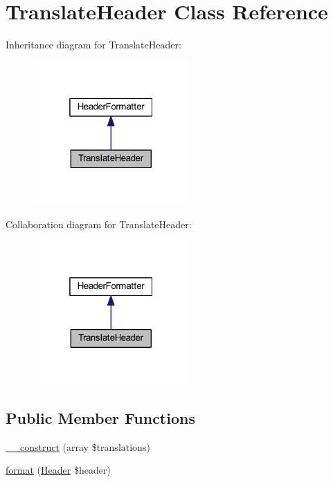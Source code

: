\hypertarget{classhamburgscleanest_1_1_data_tables_1_1_models_1_1_header_formatters_1_1_translate_header}{}\section{Translate\+Header Class Reference}
\label{classhamburgscleanest_1_1_data_tables_1_1_models_1_1_header_formatters_1_1_translate_header}


Inheritance diagram for Translate\+Header\+:\nopagebreak
\begin{figure}[H]
\begin{center}
\leavevmode
\includegraphics[width=169pt]{classhamburgscleanest_1_1_data_tables_1_1_models_1_1_header_formatters_1_1_translate_header__inherit__graph}
\end{center}
\end{figure}


Collaboration diagram for Translate\+Header\+:\nopagebreak
\begin{figure}[H]
\begin{center}
\leavevmode
\includegraphics[width=169pt]{classhamburgscleanest_1_1_data_tables_1_1_models_1_1_header_formatters_1_1_translate_header__coll__graph}
\end{center}
\end{figure}
\subsection*{Public Member Functions}
\begin{DoxyCompactItemize}
\item 
\hyperlink{classhamburgscleanest_1_1_data_tables_1_1_models_1_1_header_formatters_1_1_translate_header_acc98a5aed09e4bdbeaa0bd231155a021}{\+\_\+\+\_\+construct} (array \$translations)
\item 
\hyperlink{classhamburgscleanest_1_1_data_tables_1_1_models_1_1_header_formatters_1_1_translate_header_aa5aeddf9c056d9583b29322f75f70f82}{format} (\hyperlink{classhamburgscleanest_1_1_data_tables_1_1_models_1_1_header}{Header} \$header)
\end{DoxyCompactItemize}


